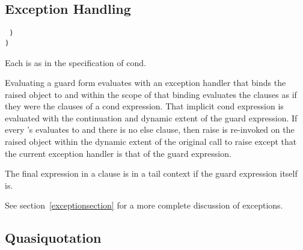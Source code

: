 \subsection{Exception Handling}\unsection
\label{guard}

\begin{entry}{%
{\tt\obeyspaces%
\hspace*{4em}  \dotsfoo)\\
\hspace*{2em})}\\
}

\syntax
Each  is as in the specification of {\cf cond}.

\semantics
Evaluating a {\cf guard} form evaluates  with an exception
handler that binds the raised object to  and within the scope of
that binding evaluates the clauses as if they were the clauses of a
{\cf cond} expression. That implicit {\cf cond} expression is evaluated with the
continuation and dynamic extent of the {\cf guard} expression. If every
's  evaluates to \schfalse{} and there
is no {\cf else} clause, then
{\cf raise} is re-invoked on the raised object within the dynamic
extent of the original call to {\cf raise} except that the current
exception handler is that of the {\cf guard} expression.

The final expression in a  clause is in a tail context if
the {\cf guard} expression itself is.

See section~\ref{exceptionsection} for a more complete discussion of
exceptions.
\end{entry}


\subsection{Quasiquotation}\unsection
\label{quasiquotesection}

